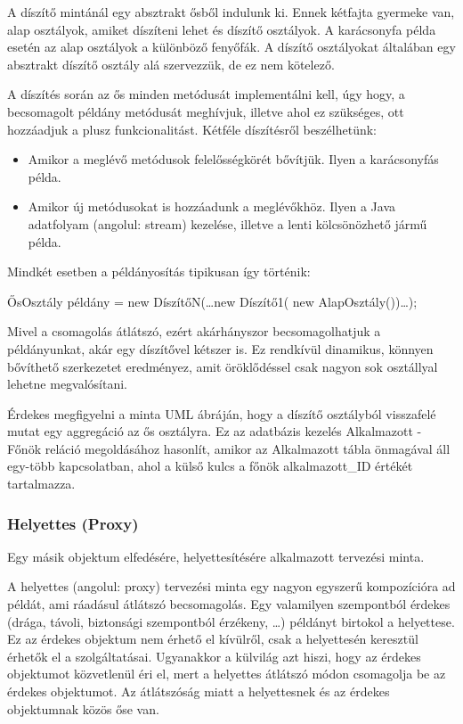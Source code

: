 \documentclass[margin=0px]{article}
\begin{document}
A díszítő mintánál egy absztrakt ősből indulunk ki. Ennek kétfajta gyermeke van, alap osztályok, amiket díszíteni lehet és díszítő osztályok. A karácsonyfa példa esetén az alap osztályok a különböző fenyőfák. A díszítő osztályokat általában egy absztrakt díszítő osztály alá szervezzük, de ez nem kötelező.

A díszítés során az ős minden metódusát implementálni kell, úgy hogy, a becsomagolt példány metódusát meghívjuk, illetve ahol ez szükséges, ott hozzáadjuk a plusz funkcionalitást. Kétféle díszítésről beszélhetünk:
\begin{itemize}
    \item Amikor a meglévő metódusok felelősségkörét bővítjük. Ilyen a karácsonyfás példa.
    \item Amikor új metódusokat is hozzáadunk a meglévőkhöz. Ilyen a Java adatfolyam (angolul: stream) kezelése, illetve a lenti kölcsönözhető jármű példa.
\end{itemize}

Mindkét esetben a példányosítás tipikusan így történik:

ŐsOsztály példány = new DíszítőN(…new Díszítő1( new AlapOsztály())…);

Mivel a csomagolás átlátszó, ezért akárhányszor becsomagolhatjuk a példányunkat, akár egy díszítővel kétszer is. Ez rendkívül dinamikus, könnyen bővíthető szerkezetet eredményez, amit öröklődéssel csak nagyon sok osztállyal lehetne megvalósítani.

Érdekes megfigyelni a minta UML ábráján, hogy a díszítő osztályból visszafelé mutat egy aggregáció az ős osztályra. Ez az adatbázis kezelés Alkalmazott - Főnök reláció megoldásához hasonlít, amikor az Alkalmazott tábla önmagával áll egy-több kapcsolatban, ahol a külső kulcs a főnök alkalmazott\_ID értékét tartalmazza.

\subsubsection{Helyettes (Proxy)}
Egy másik objektum elfedésére, helyettesítésére alkalmazott tervezési minta.

A helyettes (angolul: proxy) tervezési minta egy nagyon egyszerű kompozícióra ad példát, ami ráadásul átlátszó becsomagolás. Egy valamilyen szempontból érdekes (drága, távoli, biztonsági szempontból érzékeny, …) példányt birtokol a helyettese. Ez az érdekes objektum nem érhető el kívülről, csak a helyettesén keresztül érhetők el a szolgáltatásai. Ugyanakkor a külvilág azt hiszi, hogy az érdekes objektumot közvetlenül éri el, mert a helyettes átlátszó módon csomagolja be az érdekes objektumot. Az átlátszóság miatt a helyettesnek és az érdekes objektumnak közös őse van.
\end{document}
